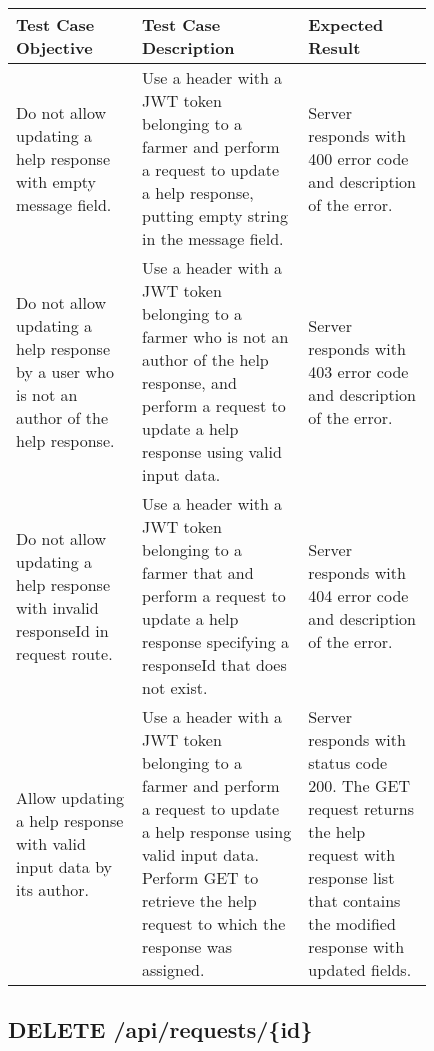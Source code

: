 \begin{longtable}{p{0.25\linewidth}p{0.33\linewidth}p{0.25\linewidth}}
	\toprule
	\textbf{Test Case Objective} & \textbf{Test Case Description} & \textbf{Expected Result}\\
	\midrule
	Do not allow updating a help response with empty message field. & Use a header with a JWT token belonging to a farmer and perform a request to update a help response, putting empty string in the message field. & Server responds with 400 error code and description of the error.\\
	\midrule
	Do not allow updating a help response by a user who is not an author of the help response. & Use a header with a JWT token belonging to a farmer who is not an author of the help response, and perform a request to update a help response using valid input data. & Server responds with 403 error code and description of the error.\\
	\midrule
	Do not allow updating a help response with invalid responseId in request route. & Use a header with a JWT token belonging to a farmer that and perform a request to update a help response specifying a responseId that does not exist. &  Server responds with 404 error code and description of the error.\\
	\midrule
	Allow updating a help response with valid input data by its author. & Use a header with a JWT token belonging to a farmer and perform a request to update a help response using valid input data. Perform GET to retrieve the help request to which the response was assigned. & Server responds with status code 200. The GET request returns the help request with response list that contains the modified response with updated fields.\\
	\bottomrule
\end{longtable}

\subsection{DELETE \slash api\slash requests\slash \{id\}}

